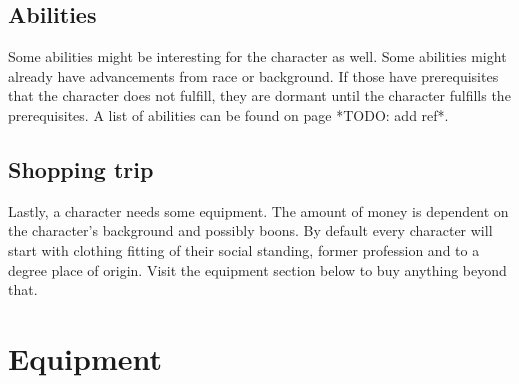 \documentclass[12pt,a4paper]{book}
\begin{document}
	\section{Abilities}
	Some abilities might be interesting for the character as well. Some abilities might already have advancements from race or background. If those have prerequisites that the character does not fulfill, they are dormant until the character fulfills the prerequisites. A list of abilities can be found on page *TODO: add ref*.
	\section{Shopping trip}
	Lastly, a character needs some equipment. The amount of money is dependent on the character’s background and possibly boons. By default every character will start with clothing fitting of their social standing, former profession and to a degree place of origin. Visit the equipment section below to buy anything beyond that. 
	
	\chapter{Equipment}
\end{document}
